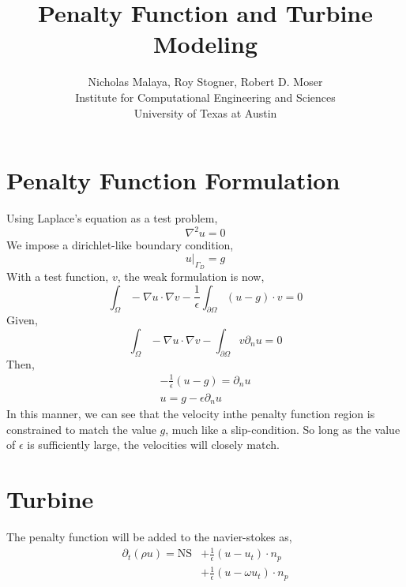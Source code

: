 \documentclass{article}
\title{\bf{Penalty Function and Turbine Modeling}}
\author{Nicholas Malaya, Roy Stogner, Robert D. Moser \\ Institute for Computational Engineering and Sciences \\ University of Texas at Austin} \date{}
\begin{document}
\maketitle

\newpage

\section{Penalty Function Formulation}

Using Laplace's equation as a test problem, 
\begin{equation}
 \nabla^2 u = 0 
\end{equation}
We impose a dirichlet-like boundary condition, 
\begin{equation}
 u|_{\Gamma_D} = g
\end{equation}
With a test function, $v$, the weak formulation is now, 
\begin{equation}
\int_{\Omega}  - \nabla u \cdot \nabla v - \frac{1}{\epsilon}
 \int_{\partial \Omega} (u-g) \cdot v = 0 
\end{equation}
Given, 
\begin{equation}
\int_{\Omega}  - \nabla u \cdot \nabla v - 
 \int_{\partial \Omega} v \partial_n u = 0 
\end{equation}
Then, 
\begin{align}
-\frac{1}{\epsilon}(u-g) = \partial_n u \\
 u = g - \epsilon \partial_n u 
\end{align}
In this manner, we can see that the velocity inthe penalty function
region is constrained to match the value $g$, much like a
slip-condition. So long as the value of $\epsilon$ is sufficiently
large, the velocities will closely match. 


\section{Turbine}

The penalty function will be added to the navier-stokes as, 
\begin{align}
 \partial_t(\rho u) = \text{NS} &+ \frac{1}{\epsilon}(u-u_t)\cdot n_p \\
                                &+ \frac{1}{\epsilon}(u-\omega u_t)\cdot n_p \\
\end{align}
\end{document}
